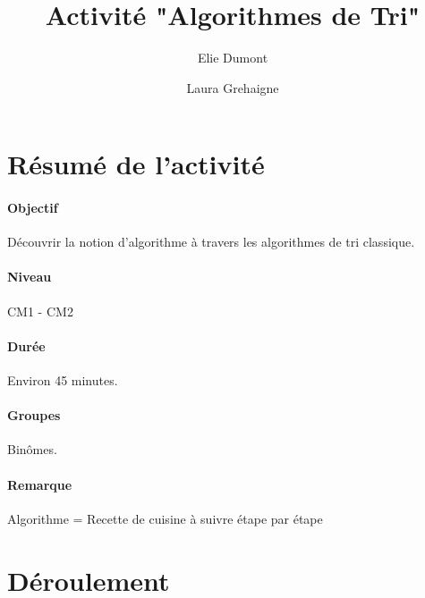 \documentclass[a4paper,11pt]{article}%
\title{Activité "Algorithmes de Tri"}%
\author{Elie Dumont \and Laura Grehaigne}%
\date{}%
\begin{document}
%

\maketitle%

\section{Résumé de l'activité}

\paragraph{Objectif}
Découvrir la notion d'algorithme à travers les algorithmes de tri classique.

\paragraph{Niveau}
CM1 - CM2

\paragraph{Durée}
Environ 45 minutes.

\paragraph{Groupes}
Binômes.

\paragraph{Remarque}
Algorithme = Recette de cuisine à suivre étape par étape

\section{Déroulement}
\end{document}
